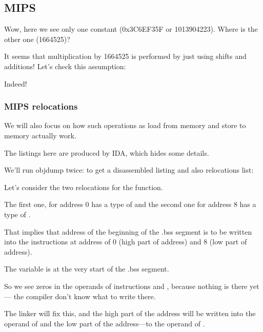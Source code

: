 \subsection{MIPS}



Wow, here we see only one constant (0x3C6EF35F or 1013904223).
Where is the other one (1664525)?

It seems that multiplication by 1664525 is performed by just using shifts and additions!
Let's check this assumption:





Indeed!

\subsubsection{MIPS relocations}

We will also focus on how such operations as load from memory and store to memory actually work.

The listings here are produced by IDA, which hides some details.

We'll run objdump twice: to get a disassembled listing and also relocations list:



Let's consider the two relocations for the  function.

The first one, for address 0 has a type of 
and the second one for address 8 has a type of .

That implies that address of the beginning of the .bss segment is to be written into the instructions at
address of 0 (high part of address) and 8 (low part of address).

The  variable is at the very start of the .bss segment.

So we see zeros in the operands of instructions \LUI and \SW, because nothing is there yet---
the compiler don't know what to write there.

The linker will fix this, and the high part of the address will be written into the operand of \LUI and
the low part of the address---to the operand of \SW.

